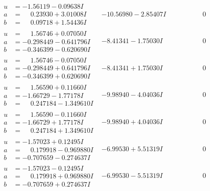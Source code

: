 \documentclass[1p]{elsarticle_modified}
\theoremstyle{definition}
\begin{document}
$$\begin{array}{c|c|c}
\begin{aligned}
u &= -1.56119 - 0.09638 I \\
a &= \phantom{-}0.23930 + 3.01008 I \\
b &= \phantom{-}0.09718 + 1.54436 I\end{aligned}
 & -10.56980 - 2.85407 I & \phantom{-0.000000 } 0 \\ \hline\begin{aligned}
u &= \phantom{-}1.56746 + 0.07050 I \\
a &= -0.298449 - 0.641796 I \\
b &= -0.346399 - 0.620690 I\end{aligned}
 & -8.41341 - 1.75030 I & \phantom{-0.000000 } 0 \\ \hline\begin{aligned}
u &= \phantom{-}1.56746 - 0.07050 I \\
a &= -0.298449 + 0.641796 I \\
b &= -0.346399 + 0.620690 I\end{aligned}
 & -8.41341 + 1.75030 I & \phantom{-0.000000 } 0 \\ \hline\begin{aligned}
u &= \phantom{-}1.56590 + 0.11660 I \\
a &= -1.66729 - 1.77178 I \\
b &= \phantom{-}0.247184 - 1.349610 I\end{aligned}
 & -9.98940 - 4.04036 I & \phantom{-0.000000 } 0 \\ \hline\begin{aligned}
u &= \phantom{-}1.56590 - 0.11660 I \\
a &= -1.66729 + 1.77178 I \\
b &= \phantom{-}0.247184 + 1.349610 I\end{aligned}
 & -9.98940 + 4.04036 I & \phantom{-0.000000 } 0 \\ \hline\begin{aligned}
u &= -1.57023 + 0.12495 I \\
a &= \phantom{-}0.179918 - 0.969880 I \\
b &= -0.707659 - 0.274637 I\end{aligned}
 & -6.99530 + 5.51319 I & \phantom{-0.000000 } 0 \\ \hline\begin{aligned}
u &= -1.57023 - 0.12495 I \\
a &= \phantom{-}0.179918 + 0.969880 I \\
b &= -0.707659 + 0.274637 I\end{aligned}
 & -6.99530 - 5.51319 I & \phantom{-0.000000 } 0\\

\end{array}$$
\end{document}
